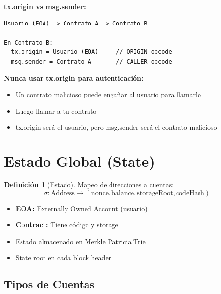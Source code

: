 \documentclass[11pt,a4paper,twoside,openright]{book}
\theoremstyle{definition}
\newtheorem{definition}{Definición}[chapter]
\theoremstyle{plain}
\theoremstyle{remark}
\begin{document}
\begin{advertencia}
\textbf{tx.origin vs msg.sender:}

\begin{verbatim}
Usuario (EOA) -> Contrato A -> Contrato B

En Contrato B:
  tx.origin = Usuario (EOA)     // ORIGIN opcode
  msg.sender = Contrato A       // CALLER opcode
\end{verbatim}

\textbf{Nunca usar tx.origin para autenticación:}
\begin{itemize}
    \item Un contrato malicioso puede engañar al usuario para llamarlo
    \item Luego llamar a tu contrato
    \item tx.origin será el usuario, pero msg.sender será el contrato malicioso
\end{itemize}
\end{advertencia}

\section{Estado Global (State)}

\begin{definition}[Estado]
Mapeo de direcciones a cuentas:
\[
\sigma: \text{Address} \to (\text{nonce}, \text{balance}, \text{storageRoot}, \text{codeHash})
\]
\end{definition}

\begin{itemize}
    \item \textbf{EOA:} Externally Owned Account (usuario)
    \item \textbf{Contract:} Tiene código y storage
    \item Estado almacenado en Merkle Patricia Trie
    \item State root en cada block header
\end{itemize}

\subsection{Tipos de Cuentas}
\end{document}
